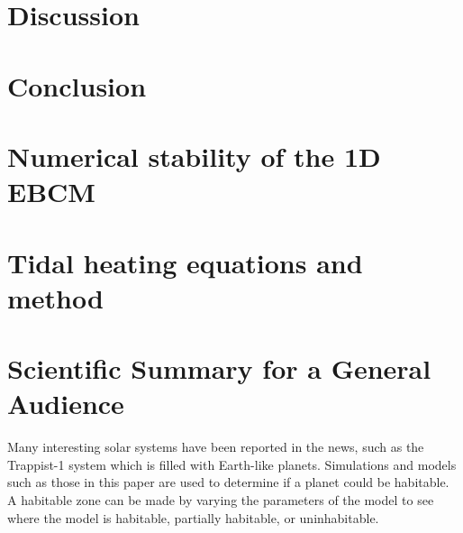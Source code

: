 \documentclass[12pt, onecolumn]{revtex4-2}    %
\begin{document}
\section{Discussion} \label{sec:Discussion}

\section{Conclusion} \label{sec:Conclusion}






\clearpage

\appendix

\section{Numerical stability of the 1D EBCM} \label{appx:NumStability}

\section{Tidal heating equations and method} \label{appx:TidalHeatingEquationsMethod}

\clearpage

\section*{Scientific Summary for a General Audience}

Many interesting solar systems have been reported in the news, such as the Trappist-1 system which is filled with Earth-like planets.
Simulations and models such as those in this paper are used to determine if a planet could be habitable.
A habitable zone can be made by varying the parameters of the model to see where the model is habitable, partially habitable, or uninhabitable.
\end{document}
